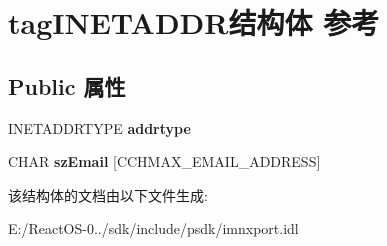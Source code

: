 \hypertarget{structtag_i_n_e_t_a_d_d_r}{}\section{tag\+I\+N\+E\+T\+A\+D\+D\+R结构体 参考}
\label{structtag_i_n_e_t_a_d_d_r}
\subsection*{Public 属性}
\begin{DoxyCompactItemize}
\item 
\mbox{\label{structtag_i_n_e_t_a_d_d_r_a131316ffd39baf32d182c1baf176e887}} 
I\+N\+E\+T\+A\+D\+D\+R\+T\+Y\+PE {\bfseries addrtype}
\item 
\mbox{\label{structtag_i_n_e_t_a_d_d_r_a03c7c72e08e79f05cdac98351cd3248f}} 
C\+H\+AR {\bfseries sz\+Email} \mbox{[}C\+C\+H\+M\+A\+X\+\_\+\+E\+M\+A\+I\+L\+\_\+\+A\+D\+D\+R\+E\+SS\mbox{]}
\end{DoxyCompactItemize}


该结构体的文档由以下文件生成\+:\begin{DoxyCompactItemize}
\item 
E\+:/\+React\+O\+S-\/0../sdk/include/psdk/imnxport.\+idl\end{DoxyCompactItemize}
